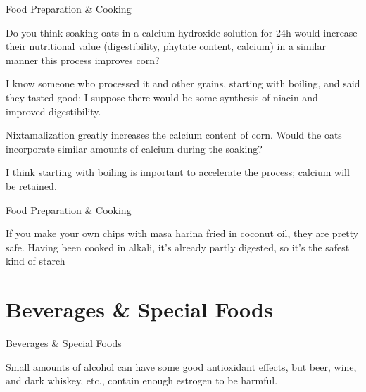 \documentclass[11pt,oneside,openany,extrafontsizes]{memoir}
\begin{document}
\begin{emailexchange}{Food Preparation \& Cooking}

    \begin{question}
        Do you think soaking oats in a calcium hydroxide solution for 24h would increase their nutritional value (digestibility, phytate content, calcium) in a similar manner this process improves corn?
    \end{question}

    \begin{answer}
      I know someone who processed it and other grains, starting with boiling, and said they tasted good; I suppose there would be some synthesis of niacin and improved digestibility.
    \end{answer}

    \begin{question}
        Nixtamalization greatly increases the calcium content of corn. Would the oats incorporate similar amounts of calcium during the soaking?
    \end{question}

    \begin{answer}
      I think starting with boiling is important to accelerate the process; calcium will be retained.
    \end{answer}
\end{emailexchange}

\begin{standalonequote}{Food Preparation \& Cooking}

    \begin{answer}
      If you make your own chips with masa harina fried in coconut oil, they are pretty safe. Having been cooked in alkali, it's already partly digested, so it's the safest kind of starch
    \end{answer}
\end{standalonequote}

\section{Beverages \& Special Foods}

\begin{standalonequote}{Beverages \& Special Foods}

    \begin{answer}
        Small amounts of alcohol can have some good antioxidant effects, but beer, wine, and dark whiskey, etc., contain enough estrogen to be harmful.
    \end{answer}
\end{standalonequote}
\end{document}
